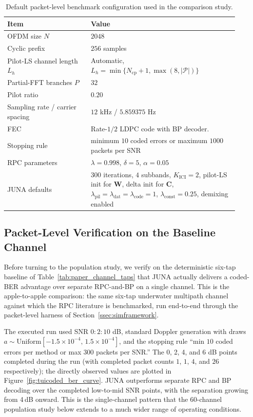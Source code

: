 \documentclass{wileysev}
\begin{document}
	\begin{table}[tbp]
		\centering
		\caption{Default packet-level benchmark configuration used in the comparison study.}
		\label{tab:benchmark_scenario_defaults}
		\begin{tabular}{p{0.34\linewidth}p{0.60\linewidth}}
			\toprule
			Item & Value \\
			\midrule
			OFDM size \(N\) & \(2048\) \\
			Cyclic prefix & \(256\) samples \\
			Pilot-LS channel length \(L_h\) & Automatic, \(L_h=\min\{N_{\mathrm{cp}}+1,\max(8,|\mathcal P|)\}\) \\
			Partial-FFT branches \(P\) & \(32\) \\
			Pilot ratio & \(0.20\) \\
			Sampling rate / carrier spacing & \(12\) kHz / \(5.859375\) Hz \\
			FEC & Rate-\(1/2\) LDPC code with BP decoder. \\
			Stopping rule & minimum \(10\) coded errors or maximum \(1000\) packets per SNR \\
			RPC parameters & \(\lambda=0.998\), \(\delta=5\), \(\alpha=0.05\) \\
			JUNA defaults & \(300\) iterations, \(4\) subbands, \(K_{\mathrm{ICI}}=2\), pilot-LS init for \(\mathbf{W}\), delta init for \(\mathbf{C}\), \(\lambda_{\mathrm{pil}}=\lambda_{\mathrm{dat}}=\lambda_{\mathrm{code}}=1\), \(\lambda_{\mathrm{const}}=0.25\), demixing enabled \\
			\bottomrule
		\end{tabular}
	\end{table}
	
	\subsection{Packet-Level Verification on the Baseline Channel}
	\label{ssec:fixed_channel}

	Before turning to the population study, we verify on the deterministic six-tap baseline of Table~\ref{tab:paper_channel_taps} that JUNA actually delivers a coded-BER advantage over separate RPC-and-BP on a single channel. This is the apple-to-apple comparison: the same six-tap underwater multipath channel against which the RPC literature is benchmarked, run end-to-end through the packet-level harness of Section~\ref{ssec:simframework}.

	The executed run used SNR \(0{:}2{:}10\) dB, standard Doppler generation with draws \(a\sim\mathrm{Uniform}[-1.5\times 10^{-4},\,1.5\times 10^{-4}]\), and the stopping rule ``min \(10\) coded errors per method or max \(300\) packets per SNR.'' The 0, 2, 4, and 6 dB points completed during the run (with completed packet counts \(1\), \(1\), \(4\), and \(26\) respectively); the directly observed values are plotted in Figure~\ref{fig:tuicoded_ber_curve}. JUNA outperforms separate RPC and BP decoding over the completed low-to-mid SNR points, with the separation growing from 4\,dB onward. This is the single-channel pattern that the 60-channel population study below extends to a much wider range of operating conditions.
\end{document}
